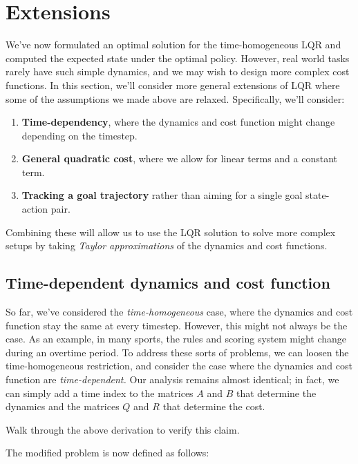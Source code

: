 \documentclass[\main/main]{subfiles}
\begin{document}
\section{Extensions}

We've now formulated an optimal solution for the time-homogeneous LQR
and computed the expected state under the optimal policy.
However, real world tasks rarely have such simple dynamics, and we may wish to design more complex cost functions.
In this section, we'll consider more general extensions of LQR where some of the assumptions we made above are relaxed.
Specifically, we'll consider:
\begin{enumerate}
    \item \textbf{Time-dependency}, where the dynamics and cost function might change depending on the timestep.
    \item \textbf{General quadratic cost}, where we allow for linear terms and a constant term.
    \item \textbf{Tracking a goal trajectory} rather than aiming for a single goal state-action pair.
\end{enumerate}
Combining these will allow us to use the LQR solution to solve more complex setups by taking \emph{Taylor approximations} of the dynamics and cost functions.

\subsection[Time-dependency]{Time-dependent dynamics and cost function} \label{sec:time_dep_lqr}

So far, we've considered the \emph{time-homogeneous} case,
where the dynamics and cost function stay the same at every timestep.
However, this might not always be the case.
As an example, in many sports, the rules and scoring system might change during an overtime period.
To address these sorts of problems, we can loosen the time-homogeneous restriction, and consider the case where the dynamics and cost function are \emph{time-dependent.}
Our analysis remains almost identical; in fact, we can simply add a time index to the matrices $A$ and $B$ that determine the dynamics and the matrices $Q$ and $R$ that determine the cost.

\begin{exercise}
    Walk through the above derivation to verify this claim.
\end{exercise}

The modified problem is now defined as follows:
\end{document}
